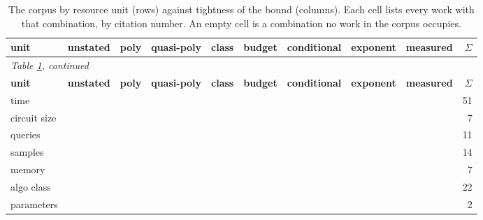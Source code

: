 \begin{landscape}
\begingroup\scriptsize\setlength{\tabcolsep}{3pt}
\begin{longtable}{lp{2.33cm}p{2.33cm}p{2.33cm}p{2.33cm}p{2.33cm}p{2.33cm}p{2.33cm}p{2.33cm}r}
\caption{The corpus by resource unit (rows) against tightness of the bound (columns). Each cell lists every work with that combination, by citation number. An empty cell is a combination no work in the corpus occupies.}\label{tab:unit-tightness}\\
\toprule \textbf{unit} & \textbf{unstated} & \textbf{poly} & \textbf{quasi-poly} & \textbf{class} & \textbf{budget} & \textbf{conditional} & \textbf{exponent} & \textbf{measured} & \textbf{$\Sigma$} \\ \midrule\endfirsthead
\multicolumn{10}{l}{\emph{Table \ref{tab:unit-tightness}, continued}}\\
\toprule \textbf{unit} & \textbf{unstated} & \textbf{poly} & \textbf{quasi-poly} & \textbf{class} & \textbf{budget} & \textbf{conditional} & \textbf{exponent} & \textbf{measured} & \textbf{$\Sigma$} \\ \midrule\endhead
\bottomrule\endfoot
time & \cite{JYCDTCP21,ZDKT25} & \cite{BCV16,BJ23,BLPR18,CHLX25,CK21,CKMMNST24,DGMRLW24,DKKLMS16,DN03,DNV19,DP20,EMM20,GKVZ22,GKY11,GSVV25,HMSTY25,HN23,HW21,KKOSVZ24,LZZ24,MPRV09,MR25,SZB21,VDKMR26,XSD24,ZSWB22} & \cite{BHJK25} &  & \cite{RV24,ZFWCSXZ26} & \cite{AHY25,AS24,BB20,BIS17,BRST21,DHSS25} & \cite{BCS24,BGGKRR25,BGHKP24,BRSV17,DLSW25,KPR25,LLW19,ZCSL24} & \cite{BDJV22,CCNSTT22,DJYWWMNL26,DKLP22,FJTYCDCP23,SSZHTE24} & 51 \\
circuit size &  & \cite{GJMM20} & \cite{ABIKN23,BW08,GHJS25} &  & \cite{BJRZ24} & \cite{GJW22a} & \cite{BC22} &  & 7 \\
queries &  &  &  &  & \cite{BBHS22,CCGJY19,FK24,ML24,NCM25} &  & \cite{ACMS23,BM09,HU14} & \cite{CCHRSS24,CJM20,SSSS17} & 11 \\
samples &  &  &  & \cite{DIKR25,WZDD24} & \cite{AH23,CBM18,MHS19,MHS22,ZYWGW25} &  & \cite{DKLM26,DLB25,DPLB24,DTAPZK24,HSU25,NK26} & \cite{SE22} & 14 \\
memory &  &  &  &  & \cite{Raz16} & \cite{DSWZ23} & \cite{BCEQ24,DQW21,DQW22,GZ19,KMNS21} &  & 7 \\
algo class &  &  &  & \cite{ABM22,ABM23,AGJ21,BAHSWZ22,BBHLS21,BHKKMP16,BPR19,CGGV25,CIM19,DGKP19,DM22,DVV16,EGV25,FGRVX17,GJW22b,HKKLMT26,JCBKP20,KLNRS08,SW22,WSPX24,Wei25,YHGA25} &  &  &  &  & 22 \\
parameters &  &  &  &  & \cite{BS21,GJMMW22} &  &  &  & 2 \\

\end{longtable}
\end{landscape}
